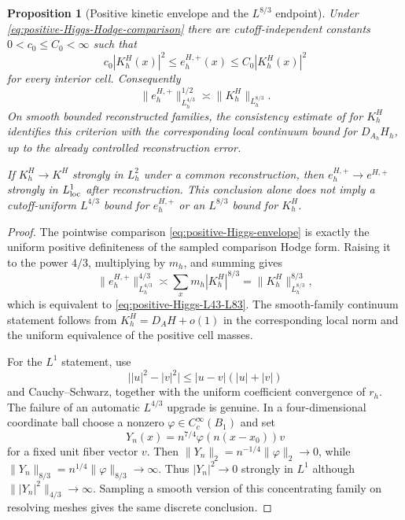 \documentclass[11pt]{article}
\numberwithin{equation}{section}
\newtheorem{proposition}[proposition]{Proposition}
\theoremstyle{definition}
\theoremstyle{remark}
\begin{document}
\begin{proposition}[Positive kinetic envelope and the $L^{8/3}$ endpoint]
\label{prop:positive-Higgs-envelope}
Under \eqref{eq:positive-Higgs-Hodge-comparison} there are cutoff-independent
constants $0<c_0\le C_0<\infty$ such that
\begin{equation}
 c_0|K_h^H(x)|^2\le e_h^{H,+}(x)\le C_0|K_h^H(x)|^2
 \label{eq:positive-Higgs-envelope}
\end{equation}
for every interior cell.  Consequently
\begin{equation}
 \boxed{
 \|e_h^{H,+}\|_{L_h^{4/3}}^{1/2}
 \asymp
 \|K_h^H\|_{L_h^{8/3}}.}
 \label{eq:positive-Higgs-L43-L83}
\end{equation}
On smooth bounded reconstructed families, the consistency estimate of
 for $K_h^H$ identifies this criterion with the
corresponding local continuum bound for $D_{A_h}H_h$, up to the already
controlled reconstruction error.

If $K_h^H\to K^H$ strongly in $L_h^2$ under a common reconstruction, then
$e_h^{H,+}\to e^{H,+}$ strongly in $L^1_{\rm loc}$ after reconstruction.
This conclusion alone does not imply a cutoff-uniform $L^{4/3}$ bound for
$e_h^{H,+}$ or an $L^{8/3}$ bound for $K_h^H$.
\end{proposition}
\begin{proof}
The pointwise comparison \eqref{eq:positive-Higgs-envelope} is exactly the
uniform positive definiteness of the sampled comparison Hodge form.  Raising
it to the power $4/3$, multiplying by $m_h$, and summing gives
\[
 \|e_h^{H,+}\|_{L_h^{4/3}}^{4/3}
 \asymp
 \sum_xm_h|K_h^H|^{8/3}
 =\|K_h^H\|_{L_h^{8/3}}^{8/3},
\]
which is equivalent to \eqref{eq:positive-Higgs-L43-L83}.  The smooth-family
continuum statement follows from $K_h^H=D_AH+o(1)$ in the corresponding
local norm and the uniform equivalence of the positive cell masses.

For the $L^1$ statement, use
\[
 \bigl||u|^2-|v|^2\bigr|
 \le |u-v|(|u|+|v|)
\]
and Cauchy--Schwarz, together with the uniform coefficient convergence of
$r_h$.  The failure of an automatic $L^{4/3}$ upgrade is genuine.  In a
four-dimensional coordinate ball choose a nonzero
$\varphi\in C_c^\infty(B_1)$ and set
\[
 Y_n(x)=n^{7/4}\varphi(n(x-x_0))v
\]
for a fixed unit fiber vector $v$.  Then
$\|Y_n\|_2=n^{-1/4}\|\varphi\|_2\to0$, while
$\|Y_n\|_{8/3}=n^{1/4}\|\varphi\|_{8/3}\to\infty$.
Thus $|Y_n|^2\to0$ strongly in $L^1$ although
$\||Y_n|^2\|_{4/3}\to\infty$.  Sampling a smooth version of this
concentrating family on resolving meshes gives the same discrete conclusion.
\end{proof}
\end{document}
